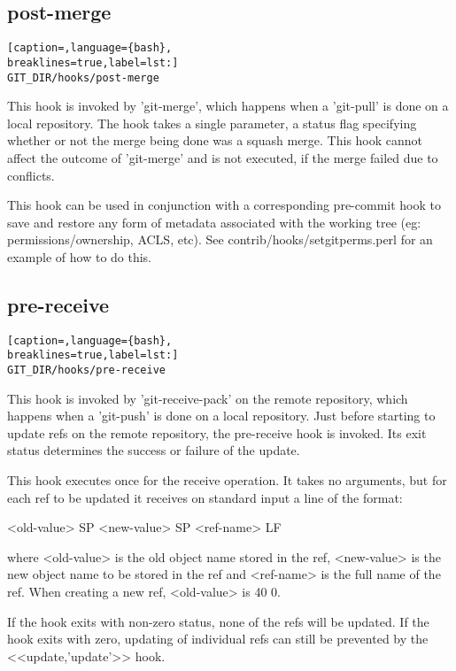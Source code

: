 \subsection{post-merge}
\lstset{basicstyle=\scriptsize, numbers=none, captionpos=b, tabsize=4}
\begin{lstlisting}[caption=,language={bash},
breaklines=true,label=lst:]
GIT_DIR/hooks/post-merge
\end{lstlisting}

This hook is invoked by 'git-merge', which happens when a 'git-pull' is done on
a local repository. The hook takes a single parameter, a status flag specifying
whether or not the merge being done was a squash merge. This hook cannot affect
the outcome of 'git-merge' and is not executed, if the merge failed due to
conflicts.

This hook can be used in conjunction with a corresponding pre-commit hook to
save and restore any form of metadata associated with the working tree (eg:
permissions/ownership, ACLS, etc). See contrib/hooks/setgitperms.perl for an
example of how to do this.

\subsection{pre-receive}
\lstset{basicstyle=\scriptsize, numbers=none, captionpos=b, tabsize=4}
\begin{lstlisting}[caption=,language={bash},
breaklines=true,label=lst:]
GIT_DIR/hooks/pre-receive
\end{lstlisting}

This hook is invoked by 'git-receive-pack' on the remote repository, which
happens when a 'git-push' is done on a local repository. Just before starting
to update refs on the remote repository, the pre-receive hook is invoked. Its
exit status determines the success or failure of the update.

This hook executes once for the receive operation. It takes no arguments, but
for each ref to be updated it receives on standard input a line of the format:

<old-value> SP <new-value> SP <ref-name> LF

where <old-value> is the old object name stored in the ref, <new-value> is the
new object name to be stored in the ref and <ref-name> is the full name of the
ref. When creating a new ref, <old-value> is 40 0.

If the hook exits with non-zero status, none of the refs will be updated. If
the hook exits with zero, updating of individual refs can still be prevented by
the <<update,'update'>> hook.

